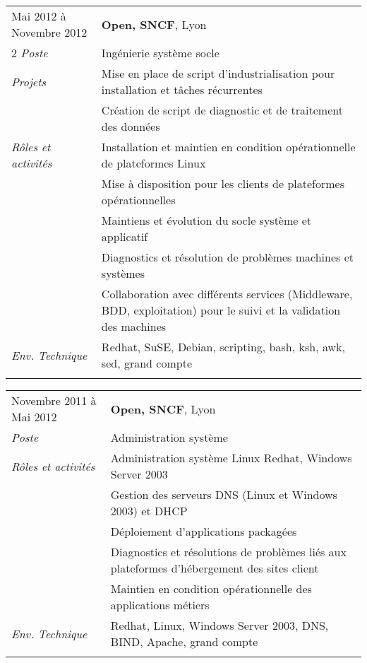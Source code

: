 \documentclass[a4paper]{article}
\begin{document}
\begin{tabular}{P{3.5cm}|p{13cm}}
Mai 2012 à Novembre 2012	& \textbf{Open, SNCF}, Lyon\\2
\textsl{Poste}			& Ingénierie système socle\\
\textsl{Projets}		& Mise en place de script d'industrialisation pour installation et tâches récurrentes\\
				& Création de script de diagnostic et de traitement des données\\
\textsl{Rôles et activités}	& Installation et maintien en condition opérationnelle de plateformes Linux\\
				& Mise à disposition pour les clients de plateformes opérationnelles\\
				& Maintiens et évolution du socle système et applicatif\\
				& Diagnostics et résolution de problèmes machines et systèmes\\
				& Collaboration avec différents services (Middleware, BDD, exploitation) pour le suivi et la validation des machines\\
\textsl{Env. Technique}		& Redhat, SuSE, Debian, scripting, bash, ksh, awk, sed, grand compte\\
 & \\
\end{tabular}

\begin{tabular}{P{3.5cm}|p{13cm}}
Novembre 2011 à Mai 2012	& \textbf{Open, SNCF}, Lyon\\
\textsl{Poste}			& Administration système\\
\textsl{Rôles et activités} 	& Administration système Linux Redhat, Windows Server 2003\\
				& Gestion des serveurs DNS (Linux et Windows 2003) et DHCP\\
				& Déploiement d'applications packagées\\
				& Diagnostics et résolutions de problèmes liés aux plateformes d'hébergement des sites client\\
				& Maintien en condition opérationnelle des applications métiers\\
\textsl{Env. Technique}		& Redhat, Linux, Windows Server 2003, DNS, BIND, Apache, grand compte\\
 & \\
\end{tabular}
\end{document}
